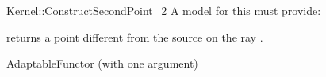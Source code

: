 \begin{ccRefFunctionObjectConcept}{Kernel::ConstructSecondPoint_2}
A model for this must provide:


 {returns a point different from the source  on
  the ray .}

\ccRefines
AdaptableFunctor (with one argument)

\ccSeeAlso
{}

\end{ccRefFunctionObjectConcept}
